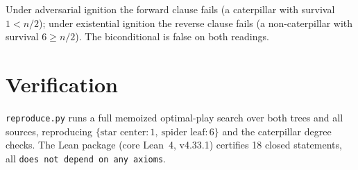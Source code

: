 \documentclass[11pt]{article}
\begin{document}
Under adversarial ignition the forward clause fails (a caterpillar with
survival $1 < n/2$); under existential ignition the reverse clause fails (a
non-caterpillar with survival $6 \ge n/2$). The biconditional is false on
both readings.

\section{Verification}

\texttt{reproduce.py} runs a full memoized optimal-play search over both
trees and all sources, reproducing
$\{\text{star center}:1,\ \text{spider leaf}:6\}$ and the caterpillar
degree checks. The Lean package (core Lean~4, v4.33.1) certifies 18 closed
statements, all \texttt{does not depend on any axioms}.
\end{document}
